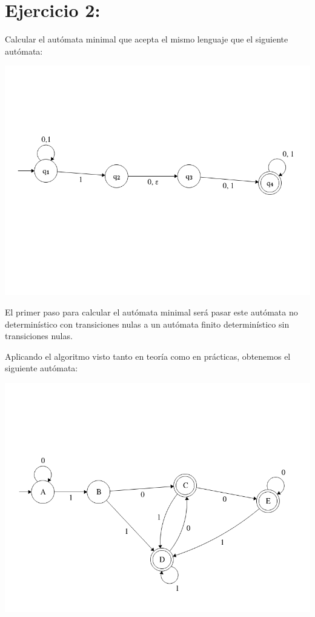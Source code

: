 \documentclass[12pt, spanish]{article}
\begin{document}
\section{Ejercicio 2:} Calcular el autómata minimal que acepta el mismo lenguaje que el siguiente autómata:

\begin{center}
	\includegraphics[scale=0.45]{enun2.png}
\end{center}

El primer paso para calcular el autómata minimal será pasar este autómata no determinístico con transiciones nulas a un autómata finito determinístico sin transiciones nulas.

Aplicando el algoritmo visto tanto en teoría como en prácticas, obtenemos el siguiente autómata:


\begin{center}
	\includegraphics[scale=0.45]{finito2.png}
\end{center}
\end{document}
